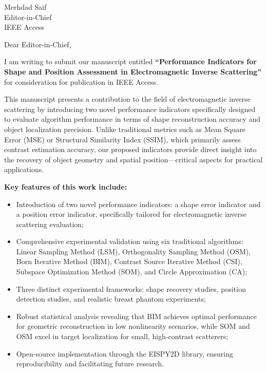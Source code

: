 \documentclass[11pt]{letter}
\begin{document}
\date{\today}

\begin{letter}{
Merhdad Saif\\
Editor-in-Chief\\
IEEE Access\\
}

\opening{Dear Editor-in-Chief,}

I am writing to submit our manuscript entitled \textbf{``Performance Indicators for Shape and Position Assessment in Electromagnetic Inverse Scattering''} for consideration for publication in IEEE Access.

This manuscript presents a contribution to the field of electromagnetic inverse scattering by introducing two novel performance indicators specifically designed to evaluate algorithm performance in terms of shape reconstruction accuracy and object localization precision. Unlike traditional metrics such as Mean Square Error (MSE) or Structural Similarity Index (SSIM), which primarily assess contrast estimation accuracy, our proposed indicators provide direct insight into the recovery of object geometry and spatial position—critical aspects for practical applications.

\textbf{Key features of this work include:}

\begin{itemize}
    \item Introduction of two novel performance indicators: a shape error indicator and a position error indicator, specifically tailored for electromagnetic inverse scattering evaluation;
    \item Comprehensive experimental validation using six traditional algorithms: Linear Sampling Method (LSM), Orthogonality Sampling Method (OSM), Born Iterative Method (BIM), Contrast Source Iterative Method (CSI), Subspace Optimization Method (SOM), and Circle Approximation (CA);
    \item Three distinct experimental frameworks: shape recovery studies, position detection studies, and realistic breast phantom experiments;
    \item Robust statistical analysis revealing that BIM achieves optimal performance for geometric reconstruction in low nonlinearity scenarios, while SOM and OSM excel in target localization for small, high-contrast scatterers;
    \item Open-source implementation through the EISPY2D library, ensuring reproducibility and facilitating future research.
\end{itemize}


\end{letter}
\end{document}
